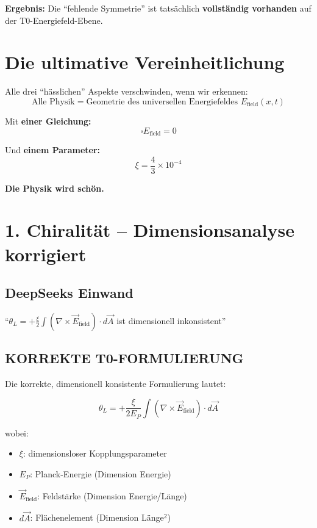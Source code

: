 	\textbf{Ergebnis:} Die ``fehlende Symmetrie'' ist tatsächlich \textbf{vollständig vorhanden} auf der T0-Energiefeld-Ebene.
	
	
	
	\section*{Die ultimative Vereinheitlichung}
	
	Alle drei ``hässlichen'' Aspekte verschwinden, wenn wir erkennen:
	\[
	\boxed{\text{Alle Physik} = \text{Geometrie des universellen Energiefeldes } E_{\text{field}}(x,t)}
	\]
	
	Mit \textbf{einer Gleichung:}
	\[
	\square E_{\text{field}} = 0
	\]
	
	Und \textbf{einem Parameter:}
	\[
	\xi = \frac{4}{3} \times 10^{-4}
	\]
	
	\textbf{Die Physik wird schön.}
	
	\section*{1. Chiralität -- Dimensionsanalyse korrigiert}
	
	\subsection*{DeepSeeks Einwand}
	``$\theta_L = +\frac{\xi}{2} \int (\nabla \times \vec{E}_{\text{field}}) \cdot d\vec{A}$ ist dimensionell inkonsistent''
	
	\subsection*{\textbf{KORREKTE T0-FORMULIERUNG}}
	
	Die korrekte, dimensionell konsistente Formulierung lautet:
	
	\[
	\theta_L = +\frac{\xi}{2E_P} \int (\nabla \times \vec{E}_{\text{field}}) \cdot d\vec{A}
	\]
	
	wobei:
	\begin{itemize}
		\item $\xi$: dimensionsloser Kopplungsparameter
		\item $E_P$: Planck-Energie (Dimension Energie)
		\item $\vec{E}_{\text{field}}$: Feldstärke (Dimension Energie/Länge)
		\item $d\vec{A}$: Flächenelement (Dimension Länge$^2$)
	\end{itemize}
	

